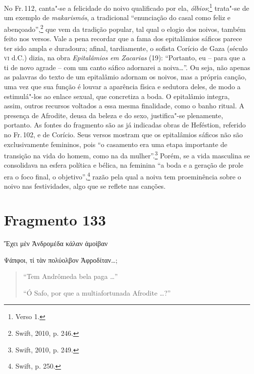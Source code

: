 No Fr.\,112, canta"-se a felicidade do noivo qualificado por ela, \textit{ólbios};\footnote{Verso 1.} trata"-se de um exemplo de \textit{makarismós}, a tradicional ``enunciação do casal como feliz e abençoado'',\footnote{Swift, 2010, p. 246.} que vem da tradição popular, tal qual o elogio dos noivos, também feito nos versos.
Vale a pena recordar que a fama dos epitalâmios sáficos parece ter
sido ampla e duradoura; afinal, tardiamente, o sofista Corício de Gaza (século
\textsc{vi} d.C.) dizia, na obra \textit{Epitalâmios em Zacarias} (19): ``Portanto, eu
-- para que a ti de novo agrade -- com um canto sáfico adornarei a noiva\ldots{}''.
Ou seja, não apenas as palavras do texto de um epitalâmio adornam os noivos,
mas a própria canção, uma vez que sua função é louvar a aparência física e
sedutora deles, de modo a estimulá"-los ao enlace sexual, que concretiza a
boda. O epitalâmio integra, assim, outros recursos voltados a essa mesma finalidade,
como o banho ritual. A presença de Afrodite, deusa da beleza e do sexo,
justifica"-se plenamente, portanto. As fontes do fragmento são as já indicadas
obras de Heféstion, referido no Fr.\,102, e de Corício.
Seus versos mostram que os epitalâmios sáficos não são exclusivamente femininos, pois ``o casamento era uma etapa importante de transição na vida do homem, como na da mulher''.\footnote{Swift, 2010, p. 249.} Porém, se a vida masculina se consolidava na esfera política e bélica, na feminina  ``a boda e a geração de prole era o foco final, o objetivo'',\footnote{Swift, p. 250.} razão pela qual a noiva tem proeminência sobre o noivo nas festividades, algo que se reflete nas canções.

\pagebreak

\section{Fragmento 133}

\begin{gkverse}
Ἔχει μὲν Ἀνδρομέδα κάλαν ἀμοίβαν

\hspace*{21mm}

Ψάπφοι, τί τὰν πολύολβον Ἀφροδίταν\ldots;
\end{gkverse}

\begin{verse}
``Tem Andrômeda bela paga \ldots{}''

\hspace*{21mm}

``Ó Safo, por que a multiafortunada Afrodite \ldots{}?''
\end{verse}

